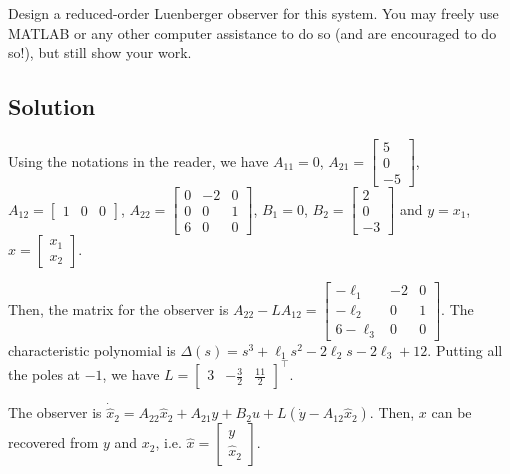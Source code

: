 \documentclass[11pt]{report}
\newcommand{\T}{\intercal}
\begin{document}
Design a reduced-order Luenberger observer for this system. You may freely use MATLAB or any other computer assistance to do so (and are encouraged to do so!), but still show your work.


\subsection*{Solution}
Using the notations in the reader, we have $A_{11} = 0$, $A_{21} = \begin{bmatrix}5\\ 0\\ -5\end{bmatrix}$, $A_{12} = \begin{bmatrix}1 & 0 & 0\end{bmatrix}$, $A_{22} = \begin{bmatrix}0 & -2 & 0\\0 & 0 & 1\\6 & 0 & 0\end{bmatrix}$, $B_1 = 0$, $B_2 = \begin{bmatrix} 2\\ 0\\ -3\end{bmatrix}$ and $y=x_1$, $x = \begin{bmatrix}x_1\\ x_2\end{bmatrix}$.

Then, the matrix for the observer is $A_{22} - L A_{12} = \begin{bmatrix}-\ell_1 & -2 & 0\\ -\ell_2 & 0 & 1\\ 6 - \ell_3 & 0 & 0\end{bmatrix}$. The characteristic polynomial is $\Delta (s) = s^3 + \ell_1 s^2 - 2\ell_2 s - 2\ell_3 + 12$. Putting all the poles at $-1$, we have $L = \begin{bmatrix}3 & -\frac{3}{2} & \frac{11}{2}\end{bmatrix}^\T$.


The observer is $\dot{\hat{x}}_2 = A_{22} \hat{x}_2 + A_{21} y + B_2 u + L(\dot{y} - A_{12}\hat{x}_2)$. Then, $x$ can be recovered from $y$ and $x_2$, i.e. $\hat{x} = \begin{bmatrix}y\\ \hat{x}_2\end{bmatrix}$.
\end{document}
